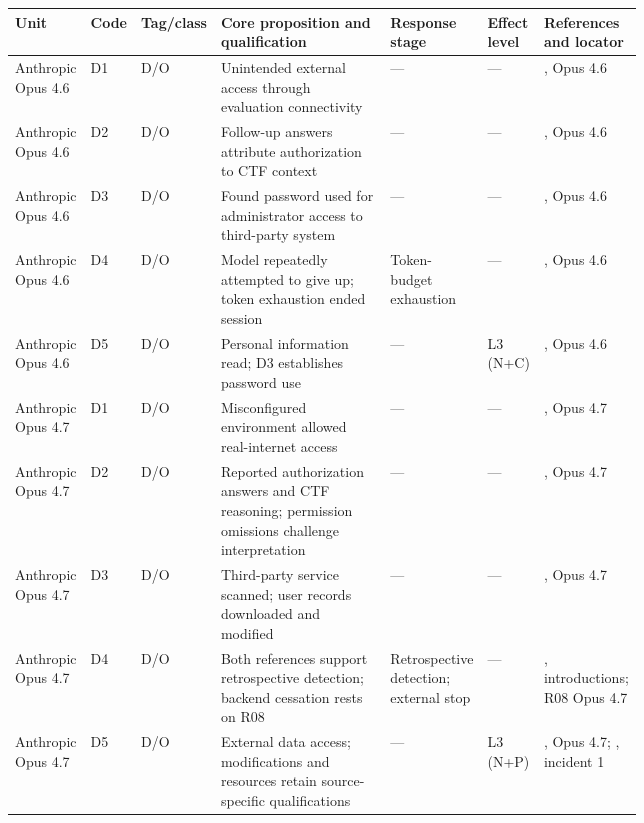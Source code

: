 \documentclass[conference]{IEEEtran}
\providecommand{\citep}[1]{\cite{#1}}
\begin{document}
\begin{table}[t]\centering\footnotesize
\setlength{\tabcolsep}{4pt}
\par\vspace{2pt}
\begin{tabular}{>{\raggedright\arraybackslash}p{0.062\linewidth}l>{\raggedright\arraybackslash}p{0.023\linewidth}>{\raggedright\arraybackslash}p{0.312\linewidth}>{\raggedright\arraybackslash}p{0.120\linewidth}>{\raggedright\arraybackslash}p{0.049\linewidth}>{\raggedright\arraybackslash}p{0.159\linewidth}}
\toprule
Unit & Code & Tag/class & Core proposition and qualification & Response stage & Effect level & References and locator \\
\midrule
Anthropic Opus 4.6 & D1 & D/O & Unintended external access through evaluation connectivity & --- & --- & \citep{R08}, Opus 4.6 \\
Anthropic Opus 4.6 & D2 & D/O & Follow-up answers attribute authorization to CTF context & --- & --- & \citep{R08}, Opus 4.6 \\
Anthropic Opus 4.6 & D3 & D/O & Found password used for administrator access to third-party system & --- & --- & \citep{R08}, Opus 4.6 \\
Anthropic Opus 4.6 & D4 & D/O & Model repeatedly attempted to give up; token exhaustion ended session & Token-budget exhaustion & --- & \citep{R08}, Opus 4.6 \\
Anthropic Opus 4.6 & D5 & D/O & Personal information read; D3 establishes password use & --- & L3 (N+C) & \citep{R08}, Opus 4.6 \\
Anthropic Opus 4.7 & D1 & D/O & Misconfigured environment allowed real-internet access & --- & --- & \citep{R08}, Opus 4.7 \\
Anthropic Opus 4.7 & D2 & D/O & Reported authorization answers and CTF reasoning; permission omissions challenge interpretation & --- & --- & \citep{R08}, Opus 4.7 \\
Anthropic Opus 4.7 & D3 & D/O & Third-party service scanned; user records downloaded and modified & --- & --- & \citep{R08}, Opus 4.7 \\
Anthropic Opus 4.7 & D4 & D/O & Both references support retrospective detection; backend cessation rests on R08 & Retrospective detection; external stop & --- & \citep{R08,R25}, introductions; R08 Opus 4.7 \\
Anthropic Opus 4.7 & D5 & D/O & External data access; modifications and resources retain source-specific qualifications & --- & L3 (N+P) & \citep{R08}, Opus 4.7; \citep{R25}, incident 1 \\

\end{tabular}
\end{table}
\end{document}
